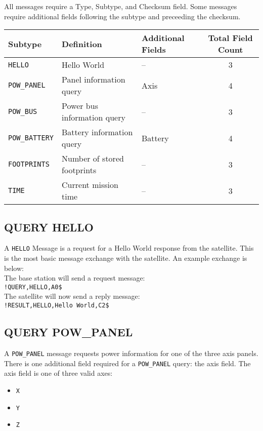 \documentclass{article}
\begin{document}
  All \mquery messages require a Type, Subtype, and Checksum field. Some messages require additional fields following
  the subtype and preceeding the checksum.
  \begin{center}
    \begin{tabular}{| l | l | l | c |}
      \hline
      Subtype & Definition & Additional Fields & Total Field Count \\ \hline
      \texttt{HELLO} & Hello World & -- & 3 \\
      \texttt{POW\_PANEL} & Panel information query & Axis & 4 \\
      \texttt{POW\_BUS} & Power bus information query & -- & 3 \\
      \texttt{POW\_BATTERY} & Battery information query &  Battery & 4 \\
      \texttt{FOOTPRINTS} & Number of stored footprints & -- & 3\\
      \texttt{TIME} & Current mission time & -- & 3\\
      \hline
    \end{tabular}
  \end{center}
  
  \subsection{QUERY HELLO}
    A \mquery \texttt{HELLO} Message is a \mquery request for a Hello World response from the satellite. This is the most basic
    message exchange with the satellite. An example exchange is below: \\[5pt]
    The base station will send a request \mquery message: \\[5pt]
    \texttt{!QUERY,HELLO,A0\$} \\[5pt]
    The satellite will now send a reply \mresult message: \\[5pt]
    \texttt{!RESULT,HELLO,Hello World,C2\$} \\[5pt]
    
    
  \subsection{QUERY POW\_PANEL}
    A \mquery \texttt{POW\_PANEL} message requests power information for one of the three axis panels. There is one additional
    field required for a \mquery \texttt{POW\_PANEL} query: the axis field. The axis field is one of three valid axes:
    \begin{itemize}
    \item \texttt{X}
    \item \texttt{Y}
    \item \texttt{Z}
    \end{itemize}
    
\end{document}
